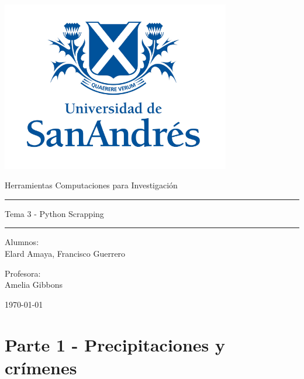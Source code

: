 \documentclass[11pt,a4paper]{article}
\begin{document}
\thispagestyle{empty}
\begin{center}
\includegraphics[width=10cm]{logo udesa.PNG}
\end{center}


	\begin{center}
	\LARGE
	Herramientas Computaciones para Investigación
\\			\vspace{1cm}
\hrule
	\vspace{0.5cm}
	\LARGE
 Tema 3 - Python Scrapping
\\		
		\vspace{0.5cm}
		\hrule
				\vspace{1cm}
	\large

	\vspace{2.5cm}
	\large
		Alumnos:\\
	\large
	Elard Amaya, Francisco Guerrero
	
	
	\vspace{1.3cm}
	\normalsize	
	Profesora:\\

	\normalsize
	Amelia Gibbons
	
	\vspace{1.3cm}
	\today
	\end{center}

\clearpage
\section*{Parte 1 - Precipitaciones y crímenes}
\end{document}
